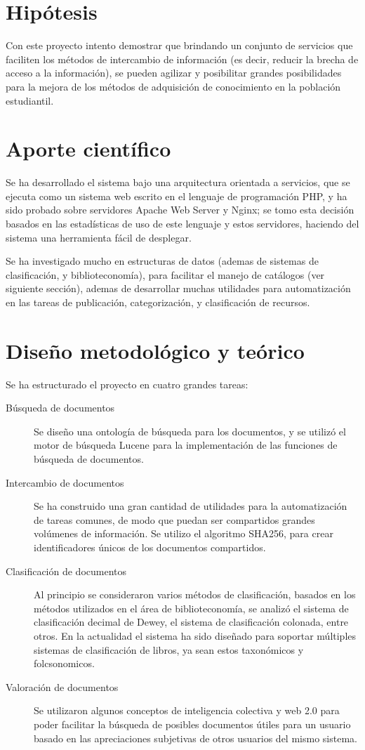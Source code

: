 \documentclass[letter,11pt,oneside,spanish]{article}
\begin{document}
\section{Hipótesis}
Con este proyecto intento demostrar que brindando un conjunto de servicios que
faciliten los métodos de intercambio de información (es decir, reducir la brecha
de acceso a la información), se pueden agilizar y posibilitar grandes
posibilidades para la mejora de los métodos de adquisición de conocimiento en la
población estudiantil.

\section{Aporte científico}
Se ha desarrollado el sistema bajo una arquitectura orientada a servicios, que
se ejecuta como un sistema web escrito en el lenguaje de programación PHP, y ha
sido probado sobre servidores Apache Web Server y Nginx; se tomo esta decisión
basados en las estadísticas de uso de este lenguaje y estos servidores, haciendo
del sistema una herramienta fácil de desplegar.

Se ha investigado mucho en estructuras de datos (ademas de sistemas de
clasificación, y biblioteconomía), para facilitar el manejo de catálogos (ver
siguiente sección), ademas de desarrollar muchas utilidades para automatización
en las tareas de publicación, categorización, y clasificación de recursos.

\section{Diseño metodológico y teórico}
Se ha estructurado el proyecto en cuatro grandes tareas:

\begin{description}
\item [Búsqueda de documentos]
    Se diseño una ontología de búsqueda para los documentos, y se utilizó el
    motor de búsqueda Lucene para la implementación de las funciones de búsqueda
    de documentos.
\item [Intercambio de documentos]
    Se ha construido una gran cantidad de utilidades para la automatización de
    tareas comunes, de modo que puedan ser compartidos grandes volúmenes de
    información. Se utilizo el algoritmo SHA256, para crear identificadores
    únicos de los documentos compartidos.
\item [Clasificación de documentos]
    Al principio se consideraron varios métodos de clasificación, basados en los
    métodos utilizados en el área de biblioteconomía, se analizó el sistema de
    clasificación decimal de Dewey, el sistema de clasificación colonada, entre
    otros.
    En la actualidad el sistema ha sido diseñado para soportar múltiples
    sistemas de clasificación de libros, ya sean estos taxonómicos y
    folcsonomicos.
\item [Valoración de documentos]
    Se utilizaron algunos conceptos de inteligencia colectiva y web 2.0 para
    poder facilitar la búsqueda de posibles documentos útiles para un usuario
    basado en las apreciaciones subjetivas de otros usuarios del mismo sistema.
\end{description}
\end{document}
